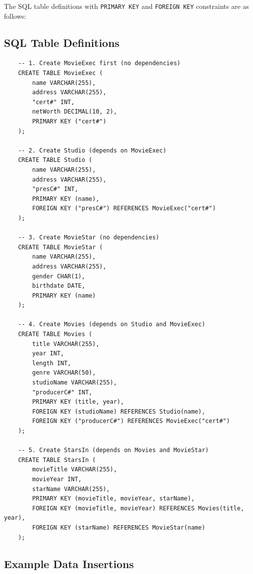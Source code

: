 \documentclass{cshwk}
\begin{document}
\noindent The SQL table definitions with \texttt{PRIMARY KEY} and \texttt{FOREIGN KEY} constraints are as follows:

\subsection*{SQL Table Definitions}

\begin{verbatim}
    -- 1. Create MovieExec first (no dependencies)
    CREATE TABLE MovieExec (
        name VARCHAR(255),
        address VARCHAR(255),
        "cert#" INT,
        netWorth DECIMAL(10, 2),
        PRIMARY KEY ("cert#")
    );
    
    -- 2. Create Studio (depends on MovieExec)
    CREATE TABLE Studio (
        name VARCHAR(255),
        address VARCHAR(255),
        "presC#" INT,
        PRIMARY KEY (name),
        FOREIGN KEY ("presC#") REFERENCES MovieExec("cert#")
    );
    
    -- 3. Create MovieStar (no dependencies)
    CREATE TABLE MovieStar (
        name VARCHAR(255),
        address VARCHAR(255),
        gender CHAR(1),
        birthdate DATE,
        PRIMARY KEY (name)
    );
    
    -- 4. Create Movies (depends on Studio and MovieExec)
    CREATE TABLE Movies (
        title VARCHAR(255),
        year INT,
        length INT,
        genre VARCHAR(50),
        studioName VARCHAR(255),
        "producerC#" INT,
        PRIMARY KEY (title, year),
        FOREIGN KEY (studioName) REFERENCES Studio(name),
        FOREIGN KEY ("producerC#") REFERENCES MovieExec("cert#")
    );
    
    -- 5. Create StarsIn (depends on Movies and MovieStar)
    CREATE TABLE StarsIn (
        movieTitle VARCHAR(255),
        movieYear INT,
        starName VARCHAR(255),
        PRIMARY KEY (movieTitle, movieYear, starName),
        FOREIGN KEY (movieTitle, movieYear) REFERENCES Movies(title, year),
        FOREIGN KEY (starName) REFERENCES MovieStar(name)
    );    
\end{verbatim}

\subsection*{Example Data Insertions}
\end{document}
